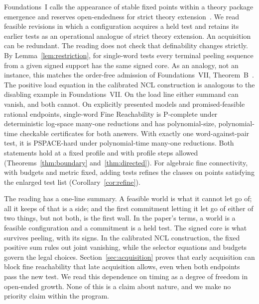 Foundations~I calls the appearance of stable fixed
points within a theory package emergence and reserves open-endedness for
strict theory extension~\cite[Section~3.4]{foundations1}. We read feasible
revisions in which a configuration acquires a held test and retains its
earlier tests as an operational analogue of strict theory extension. An
acquisition can be redundant. The reading does not check that definability
changes strictly.
By Lemma~\ref{lem:restriction}, for single-word tests every terminal
peeling sequence from a given signed support has the same signed core.
As an analogy, not an instance, this matches the order-free admission of
Foundations~VII, Theorem~B~\cite{foundations7}.
The positive load equation in the calibrated NCL construction is analogous
to the disabling example in Foundations~VII. On the load line either
summand can vanish, and both cannot.
On explicitly presented models and
promised-feasible rational endpoints, single-word Fine Reachability is
P-complete under deterministic log-space many-one reductions and has
polynomial-size, polynomial-time checkable certificates for both answers.
With exactly one word-against-pair test, it is PSPACE-hard under
polynomial-time many-one reductions. Both statements hold at a fixed
profile and with profile steps allowed (Theorems~\ref{thm:boundary}
and~\ref{thm:directed}). For algebraic fine connectivity, with budgets and metric
fixed, adding tests refines the classes on points satisfying the enlarged
test list (Corollary~\ref{cor:refine}).

The reading has a one-line summary. A feasible world is what it cannot let
go of; all it keeps of that is a side; and the first commitment letting it
let go of either of two things, but not both, is the first wall. In the paper's terms, a
world is a feasible configuration and a commitment is a held test. The
signed core is what survives peeling, with its signs. In the calibrated
NCL construction, the fixed positive sum rules out joint vanishing, while
the selector equations and budgets govern the legal choices. Section~\ref{sec:acquisition} proves that early acquisition can
block fine reachability that late acquisition allows, even when both
endpoints pass the new test. We read this dependence on timing as a degree
of freedom in open-ended growth. None of this is a claim about nature, and
we make no priority claim within the program.
